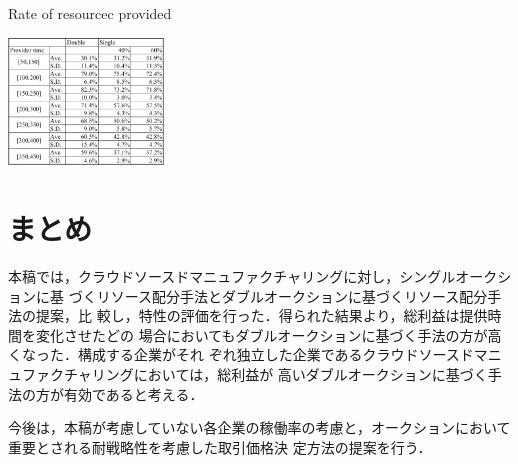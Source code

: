 \documentclass{ujarticle}
\begin{document}
\begin{table}[H]

  \caption{Rate of resourcec provided}
  \label{tab:provide_rate}
  \centering
  \includegraphics[width=0.31\textwidth]{provide_rate.pdf} 
\end{table}

\section{まとめ}
本稿では，クラウドソースドマニュファクチャリングに対し，シングルオークションに基
づくリソース配分手法とダブルオークションに基づくリソース配分手法の提案，比
較し，特性の評価を行った．得られた結果より，総利益は提供時間を変化させたどの
場合においてもダブルオークションに基づく手法の方が高くなった．構成する企業がそれ
ぞれ独立した企業であるクラウドソースドマニュファクチャリングにおいては，総利益が
高いダブルオークションに基づく手法の方が有効であると考える．\par
今後は，本稿が考慮していない各企業の稼働率の考慮と，オークションにおいて重要とされる耐戦略性を考慮した取引価格決
定方法の提案を行う．
 

\end{document}
